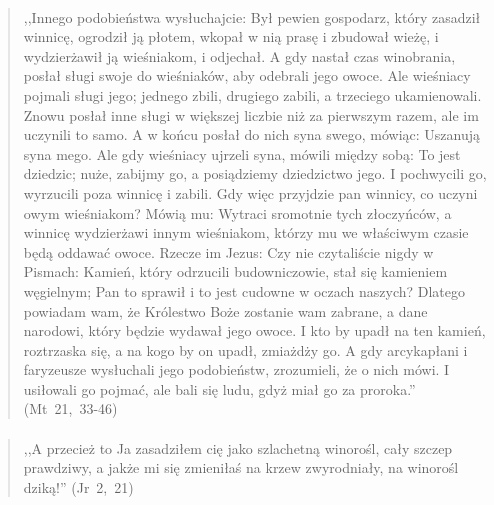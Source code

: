 \documentclass[10pt,a4paper,oneside]{article}
\begin{document}
\paragraph{}
\begin{quote}
,,Innego podobieństwa wysłuchajcie: Był pewien gospodarz, który zasadził winnicę, ogrodził ją płotem, wkopał w nią prasę i zbudował wieżę, i wydzierżawił ją wieśniakom, i odjechał. A gdy nastał czas winobrania, posłał sługi swoje do wieśniaków, aby odebrali jego owoce. Ale wieśniacy pojmali sługi jego; jednego zbili, drugiego zabili, a trzeciego ukamienowali. Znowu posłał inne sługi w większej liczbie niż za pierwszym razem, ale im uczynili to samo. A w końcu posłał do nich syna swego, mówiąc: Uszanują syna mego. Ale gdy wieśniacy ujrzeli syna, mówili między sobą: To jest dziedzic; nuże, zabijmy go, a posiądziemy dziedzictwo jego. I pochwycili go, wyrzucili poza winnicę i zabili. Gdy więc przyjdzie pan winnicy, co uczyni owym wieśniakom? Mówią mu: Wytraci sromotnie tych złoczyńców, a winnicę wydzierżawi innym wieśniakom, którzy mu we właściwym czasie będą oddawać owoce. Rzecze im Jezus: Czy nie czytaliście nigdy w Pismach: Kamień, który odrzucili budowniczowie, stał się kamieniem węgielnym; Pan to sprawił i to jest cudowne w oczach naszych? Dlatego powiadam wam, że Królestwo Boże zostanie wam zabrane, a dane narodowi, który będzie wydawał jego owoce. I kto by upadł na ten kamień, roztrzaska się, a na kogo by on upadł, zmiażdży go. A gdy arcykapłani i faryzeusze wysłuchali jego podobieństw, zrozumieli, że o nich mówi. I usiłowali go pojmać, ale bali się ludu, gdyż miał go za proroka.'' \mbox{(Mt 21, 33-46)}
\end{quote}
\paragraph{}
\begin{quote}
,,A przecież to Ja zasadziłem cię jako szlachetną winorośl, cały szczep prawdziwy, a jakże mi się zmieniłaś na krzew zwyrodniały, na winorośl dziką!'' \mbox{(Jr 2, 21)}
\end{quote}
\end{document}
